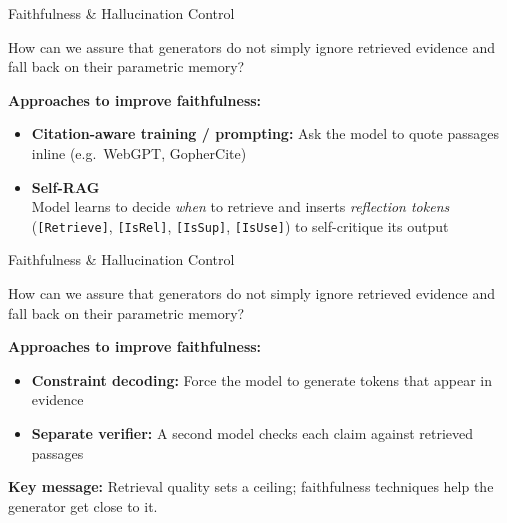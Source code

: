 \documentclass[11pt,compress,t,notes=noshow, xcolor=table]{beamer}
\begin{document}
\begin{frame}{Faithfulness \& Hallucination Control}

\vspace{1em}

\ques How can we assure that generators do not simply ignore retrieved evidence and fall back on their parametric memory?

\vspace{1em}

\textbf{Approaches to improve faithfulness:}

\vspace{1em}

\begin{itemize}
    \item \textbf{Citation-aware training / prompting:} Ask the model to quote passages inline (e.g.\ WebGPT, GopherCite)
    \item \textbf{Self-RAG} \\
          Model learns to decide \textit{when} to retrieve and inserts \textit{reflection tokens} (\texttt{[Retrieve]}, \texttt{[IsRel]}, \texttt{[IsSup]}, \texttt{[IsUse]}) to self-critique its output
			\end{itemize}		
					
\vfill

\end{frame}


\begin{frame}{Faithfulness \& Hallucination Control}

\vspace{1em}

\ques How can we assure that generators do not simply ignore retrieved evidence and fall back on their parametric memory?

\vspace{1em}

\textbf{Approaches to improve faithfulness:}

\vspace{1em}

\begin{itemize}
    \item \textbf{Constraint decoding:} Force the model to generate tokens that appear in evidence
    \item \textbf{Separate verifier:} A second model checks each claim against retrieved passages
\end{itemize}

\vspace{1em}

\textbf{Key message:} Retrieval quality sets a ceiling; faithfulness techniques help the generator get close to it.

\vfill

\end{frame}
\end{document}
